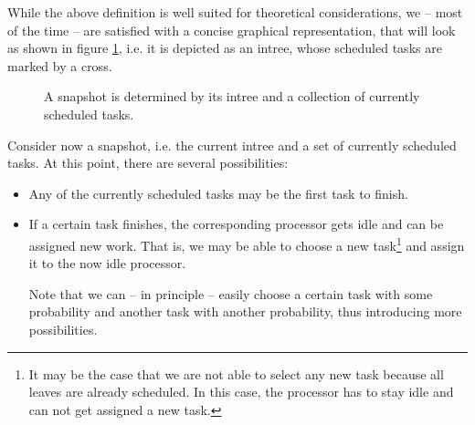 While the above definition is well suited for theoretical considerations, we -- most of the time -- are satisfied with a concise graphical representation, that will look as shown in figure \ref{fig:intro-snapshot-graphical-representation}, i.e. it is depicted as an intree, whose scheduled tasks are marked by a cross.

\begin{figure}[t]
  \centering
  \caption{A snapshot is determined by its intree and a collection of currently scheduled tasks.}
  \label{fig:intro-snapshot-graphical-representation}
\end{figure}

Consider now a snapshot, i.e. the current intree and a set of currently scheduled tasks. At this point, there are several possibilities:

\begin{itemize}
\item Any of the currently scheduled tasks may be the first task to finish.
\item If a certain task finishes, the corresponding processor gets idle and can be assigned new work. That is, we may be able to choose a new task\footnote{It may be the case that we are not able to select any new task because all leaves are already scheduled. In this case, the processor has to stay idle and can not get assigned a new task.} and assign it to the now idle processor.

  Note that we can -- in principle -- easily choose a certain task with some probability and another task with another probability, thus introducing more possibilities.
\end{itemize}

